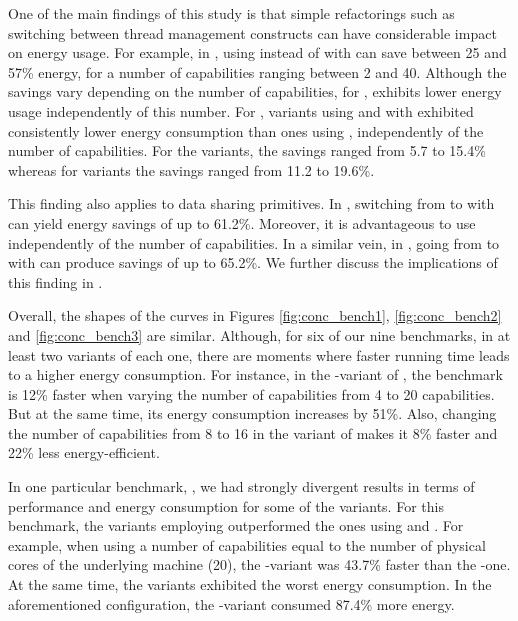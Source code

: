  One of the main findings of this study is that simple refactorings such as switching between thread management constructs can have considerable impact on energy usage. For example, in \spectral, using \forkOn instead of \forkOS with \TVar can save between 25 and 57\% energy, for a number of capabilities ranging between 2 and 40. Although the savings vary depending on the number of capabilities, for \spectral, \forkOn exhibits lower energy usage independently of this number. For \mandelbrot, variants using \forkOS and \forkOn with \MVar exhibited consistently lower energy consumption than ones using \forkIO, independently of the number of capabilities. For the \forkOS variants, the savings ranged from 5.7 to 15.4\% whereas for \forkOn variants the savings ranged from 11.2 to 19.6\%.

This finding also applies to data sharing primitives. In \chameneos, switching from \TMVar to \MVar with \forkOn can yield energy savings of up to 61.2\%. Moreover, it is advantageous to use \MVar independently of the number of capabilities. In a similar vein, in \fasta, going from \TVar to \MVar with \forkIO can produce savings of up to 65.2\%. We further discuss the implications of this finding in .
\newline

 Overall, the shapes of the curves in Figures \ref{fig:conc_bench1}, \ref{fig:conc_bench2} and \ref{fig:conc_bench3} are similar. Although, for six of our nine benchmarks, in at least two variants of each one, there are moments where faster running time leads to a higher energy consumption. For instance, in the \forkOn-\TMVar variant of \regex, the benchmark is 12\% faster when varying the number of capabilities from 4 to 20 capabilities. But at the same time, its energy consumption increases by 51\%. Also, changing the number of capabilities from 8 to 16 in the \forkIO variant of \tsearch makes it 8\% faster and 22\% less energy-efficient.

In one particular benchmark, \fasta, we had strongly divergent results in terms of performance and energy consumption for some of the variants. For this benchmark, the variants  employing \TVar outperformed the ones using \TMVar and \MVar. For example, when using a number of capabilities equal to the number of physical cores of the underlying machine (20), the \forkOS-\TVar variant was 43.7\% faster than the \forkOS-\MVar one. At the same time, the \TVar variants exhibited the worst energy consumption. In the aforementioned configuration, the \forkOS-\TVar variant consumed 87.4\% more energy.
\newline

